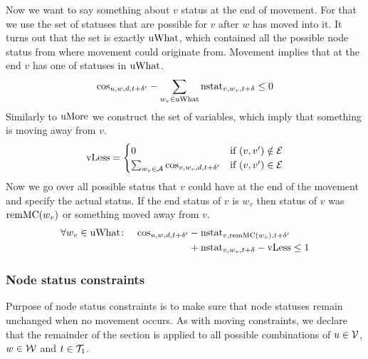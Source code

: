 Now we want to say something about $v$ status at the end of movement. For that
we use the set of statuses that are possible for $v$ after $w$ has moved into
it. It turns out that the set is exactly $\mathrm{uWhat}$, which contained all the
possible node status from where movement could originate from. Movement implies
that at the end $v$ has one of statuses in $\mathrm{uWhat}$.
\begin{align}
        \mathrm{cos}_{u,w,d,t+\delta'} -\sum_{w_v \in \mathrm{uWhat}}
        \mathrm{nstat}_{v,w_v,t+\delta} \leq 0
\end{align}
Similarly to $\mathrm{uMore}$ we construct the set of variables, which imply that something is
moving away from $v$.
\begin{align}
    \mathrm{vLess} = \begin{cases}
        0 &\text{if}\  (v,v') \notin \mathcal{E}\\
        \sum_{w_v \in \mathcal{A}} \mathrm{cos}_{v,w_v,d,t+\delta'} &\text{if}\  (v,v') \in \mathcal{E}
    \end{cases}
\end{align}
Now we go over all possible status that $v$ could have at the end of the
movement and specify the actual status. If the end status of $v$ is $w_v$ then
status of $v$ was $\mathrm{remMC}(w_v)$ or something moved away from $v$.
\begin{align}
    \begin{split}
        \forall w_v \in \mathrm{uWhat}\colon \quad
        \mathrm{cos}_{u,w,d,t+\delta'}
        &-\mathrm{nstat}_{v,\mathrm{remMC}(w_v),t+\delta'}\\
        &+\mathrm{nstat}_{v,w_v,t+\delta} -\mathrm{vLess} \leq 1
    \end{split}
\end{align}
\subsubsection{Node status constraints}
Purpose of node status constraints is to make sure that node statuses remain
unchanged when no movement occurs. As with moving constraints, we declare that
the remainder of the section is applied to all possible combinations of $u \in
\mathcal{V}$, $w \in \mathcal{W}$ and $t \in \mathcal{T}_1$.

